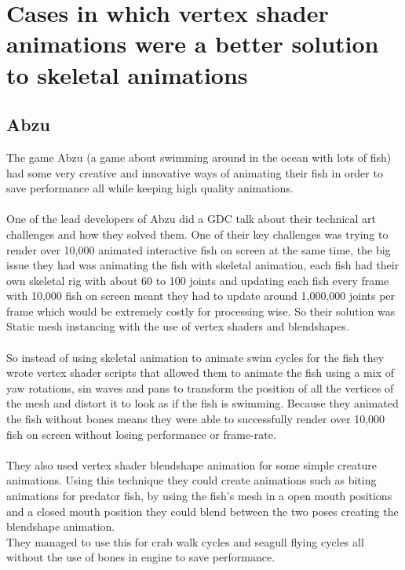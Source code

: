 \documentclass{scrartcl}
\begin{document}
\section{Cases in which vertex shader animations were a better solution to skeletal animations}

\subsection{Abzu}
The game Abzu (a game about swimming around in the ocean with lots of fish) had some very creative and innovative ways of animating their fish in order to save performance all while keeping high quality animations.
\\~\\
One of the lead developers of Abzu did a GDC talk about their technical art challenges and how they solved them.\cite{seven} One of their key challenges was trying to render over 10,000 animated interactive fish on screen at the same time, the big issue they had was animating the fish with skeletal animation, each fish had their own skeletal rig with about 60 to 100 joints and updating each fish every frame with 10,000 fish on screen meant they had to update around 1,000,000 joints per frame which would be extremely costly for processing wise. So their solution was Static mesh instancing with the use of vertex shaders and blendshapes.
\\~\\
So instead of using skeletal animation to animate swim cycles for the fish they wrote vertex shader scripts that allowed them to animate the fish using a mix of yaw rotations, sin waves and pans to transform the position of all the vertices of the mesh and distort it to look as if the fish is swimming. Because they animated the fish without bones means they were able to successfully render over 10,000 fish on screen without losing performance or frame-rate.
\\~\\
They also used vertex shader blendshape animation for some simple creature animations. Using this technique they could create animations such as biting animations for predator fish, by using the fish's mesh in a open mouth positions and a closed mouth position they could blend between the two poses creating the blendshape animation.\\
They managed to use this for crab walk cycles and seagull flying cycles all without the use of bones in engine to save performance.
\end{document}
